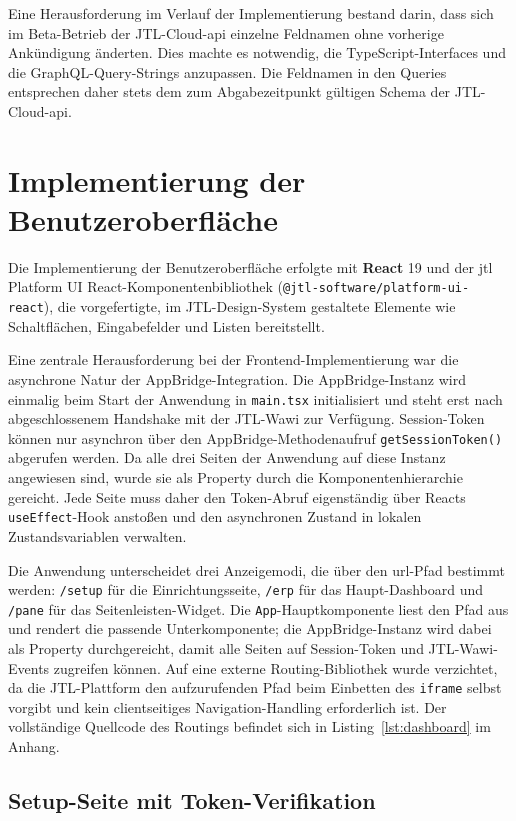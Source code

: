 \documentclass[11pt, a4paper, oneside]{report}
\begin{document}
Eine Herausforderung im Verlauf der Implementierung bestand darin, dass sich
im Beta-Betrieb der JTL-Cloud-\gls{api} einzelne Feldnamen ohne vorherige
Ankündigung änderten. Dies machte es notwendig, die TypeScript-Interfaces und
die GraphQL-Query-Strings anzupassen. Die Feldnamen in den Queries entsprechen
daher stets dem zum Abgabezeitpunkt gültigen Schema der JTL-Cloud-\gls{api}.

\section{Implementierung der Benutzeroberfläche}

Die Implementierung der Benutzeroberfläche erfolgte mit \textbf{React} 19 und der
\gls{jtl} Platform UI React-Komponentenbibliothek
(\texttt{@jtl-software/platform-ui-react}), die vorgefertigte, im JTL-Design-System
gestaltete Elemente wie Schaltflächen, Eingabefelder und Listen bereitstellt.

Eine zentrale Herausforderung bei der Frontend-Implementierung war die
asynchrone Natur der AppBridge-Integration. Die AppBridge-Instanz wird einmalig
beim Start der Anwendung in \texttt{main.tsx} initialisiert und steht erst
nach abgeschlossenem Handshake mit der JTL-Wawi zur Verfügung. Session-Token
können nur asynchron über den AppBridge-Methodenaufruf \texttt{getSessionToken()}
abgerufen werden. Da alle
drei Seiten der Anwendung auf diese Instanz angewiesen sind, wurde sie als
Property durch die Komponentenhierarchie gereicht. Jede Seite muss daher
den Token-Abruf eigenständig über Reacts \texttt{useEffect}-Hook anstoßen
und den asynchronen Zustand in lokalen Zustandsvariablen verwalten.

Die Anwendung unterscheidet drei Anzeigemodi, die über den \gls{url}-Pfad bestimmt werden:
\texttt{/setup} für die Einrichtungsseite, \texttt{/erp} für das Haupt-Dashboard
und \texttt{/pane} für das Seitenleisten-Widget. Die \texttt{App}-Hauptkomponente
liest den Pfad aus und rendert die passende Unterkomponente; die AppBridge-Instanz
wird dabei als Property durchgereicht, damit alle Seiten auf Session-Token und
JTL-Wawi-Events zugreifen können. Auf eine externe Routing-Bibliothek wurde
verzichtet, da die JTL-Plattform den aufzurufenden Pfad beim Einbetten des
\texttt{iframe} selbst vorgibt und kein clientseitiges Navigation-Handling
erforderlich ist. Der vollständige Quellcode des Routings befindet sich in
Listing~\ref{lst:dashboard} im Anhang.

\subsection{Setup-Seite mit Token-Verifikation}
\end{document}
